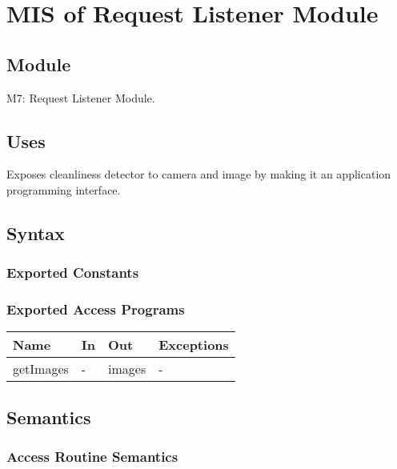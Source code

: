 \documentclass[12pt, titlepage]{article}
\begin{document}
\newpage


\section{MIS of Request Listener Module} \label{Module} 

\subsection{Module}

M7: Request Listener Module.

\subsection{Uses}
Exposes cleanliness detector to camera and image by making it an application programming interface.

\subsection{Syntax}

\subsubsection{Exported Constants}

\subsubsection{Exported Access Programs}

\begin{center}
\begin{tabular}{p{2cm} p{4cm} p{4cm} p{2cm}}
\hline
\textbf{Name} & \textbf{In} & \textbf{Out} & \textbf{Exceptions} \\
\hline
getImages & - & images & - \\
\hline
\end{tabular}
\end{center}

\subsection{Semantics}


\subsubsection{Access Routine Semantics}
\end{document}
